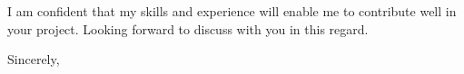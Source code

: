 \documentclass[
	backaddress=off,
	pagenumber=false, %
	parskip=half, %
	fromalign=right, %
	foldmarks=false, %
	addrfield=true %
	]{scrlttr2}
\begin{document}
\begin{letter}
I am confident that my skills and experience will enable me to contribute well  in  your project. Looking forward to discuss with you in this regard.

\closing{Sincerely,}



\end{letter}
 
\end{document}

